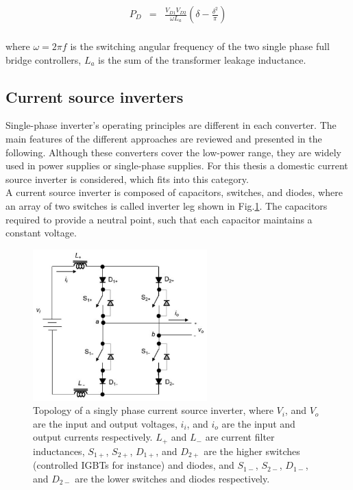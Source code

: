 {\begin{equation}
        \begin{array}{rcl}
            P_D&=&\frac{V_{D1}V_{D2}}{\omega L_a}\left(\delta-\frac{\delta^2}{\pi}\right)\\
        \end{array}
        \label{BASICMPC:equ:DCDC}
    \end{equation}
		
		where $\omega=2\pi f$ is the switching angular frequency of the two single phase full bridge controllers, $L_a$ is the
sum of the transformer leakage inductance.

\subsection{Current source inverters}\label{BASICCSR:sec:CSI}

Single-phase inverter's operating principles are different in each converter. The main features of the different approaches are reviewed and presented in the following. Although these converters cover the low-power range, they are widely used in power supplies or single-phase supplies. For this thesis a domestic current source inverter is considered, which fits into this category.\\
A current source inverter is composed of capacitors, switches, and diodes, where an array of two switches is called inverter leg shown in Fig.\ref{BASICCSR:fig:SingleCSI}. The capacitors required to provide a neutral point, such that each capacitor maintains a constant voltage.

\begin{figure}[!ht]
        \centering
        \includegraphics[width=0.6\textwidth]{EMPC_PNG_Pics/CurrentSourceInverter.png}
        \caption{Topology of a singly phase current source inverter, where $V_i$, and $V_o$ are the input and output voltages, $i_i$, and $i_o$ are the input and output currents respectively. $L_+$ and $L_-$ are current filter inductances, $S_{1+}$, $S_{2+}$, $D_{1+}$, and $D_{2+}$ are the higher switches (controlled IGBTs for instance) and diodes, and $S_{1-}$, $S_{2-}$, $D_{1-}$, and $D_{2-}$ are the lower switches and diodes respectively.}
        \label{BASICCSR:fig:SingleCSI}
    \end{figure}

}
